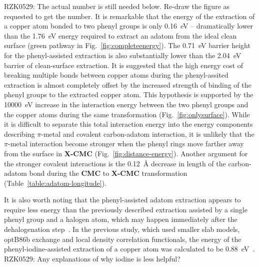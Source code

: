 \documentclass[%
 reprint,
 amsmath,amssymb,
 aps,
prb,
floatfix,
]{revtex4-2}
\newcommand{\lock}{\color{red}}
\newcommand{\lock}{\color{black}}
\newcommand{\comm}{\color{ForestGreen}} %
\begin{document}
{\lock

{\comm RZK0529: The actual number is still needed below. Re-draw the figure as requested to get the number.}
It is remarkable that the energy of the extraction of a copper atom bonded to two phenyl groups is only \SI{0.16}{\electronvolt} -- dramatically lower than the \SI{1.76}{\electronvolt} energy required to extract an adatom from the ideal clean surface (green pathway in Fig.~\ref{fig:completeenergy}). The \SI{0.71}{\electronvolt} barrier height for the phenyl-assisted extraction is also substantially lower than the \SI{2.04}{\electronvolt} barrier of clean-surface extraction.
It is suggested that the high energy cost of breaking multiple bonds between copper atoms during the phenyl-assited extraction is almost completely offset by the increased strength of binding of the phenyl groups to the extracted copper atom. This hypothesis is supported by the \SI{10000}{\electronvolt} increase in the interaction energy between the two phenyl groups and the copper atoms during the same transformation (Fig.~\ref{fig:onlysurface}). While it is difficult to separate this total interaction energy into the energy components describing $\pi$-metal and covalent carbon-adatom interaction, it is unlikely that the $\pi$-metal interaction become stronger when the phenyl rings move farther away from the surface in \textbf{X-CMC} (Fig.~\ref{fig:distance-energy}). Another argument for the stronger covalent interactions is the \SI{0.12}{\angstrom} decrease in length of the carbon-adatom bond during the \textbf{CMC} to \textbf{X-CMC} transformation (Table~\ref{table:adatom-longitude}).

It is also worth noting that the phenyl-assisted adatom extraction appears to require less energy than the previously described extraction assisted by a single phenyl group and a halogen atom, which may happen immediately after the dehalogenation step~\cite{chemeurope2017}. 
In the previous study, which used smaller slab models, optB86b exchange and local density correlation functionals, the energy of the phenyl-iodine-assisted extraction of a copper atom was calculated to be \SI{0.88}{\electronvolt}~\cite{chemeurope2017}. {\comm RZK0529: Any explanations of why iodine is less helpful?} 

}
\end{document}
